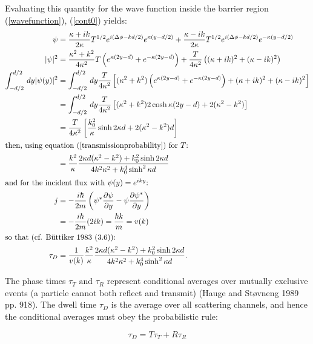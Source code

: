 \documentclass{article}
\begin{document}
\noindent Evaluating this quantity for the wave function inside the barrier region (\ref{wavefunction}), (\ref{cont0}) yields:
\begin{subequations}
\begin{align}
	\psi &= \frac{\kappa +ik}{2\kappa} T^{1/2}e^{i(\Delta\phi-kd/2)}e^{\kappa(y-d/2)} + \frac{\kappa-ik}{2\kappa}T^{1/2}e^{i(\Delta\phi-kd/2)}e^{-\kappa(y-d/2)}\\
	|\psi|^2 &= \frac{\kappa^2+k^2}{4\kappa^2}T\left(e^{\kappa(2y-d)}+e^{-\kappa(2y-d)}\right)+\frac{T}{4\kappa^2}\left((\kappa+ik)^2+(\kappa-ik)^2\right) \\
	\int_{-d/2}^{d/2}\,dy|\psi(y)|^2&=\int_{-d/2}^{d/2}\,dy\frac{T}{4\kappa^2}\left[(\kappa^2+k^2)\left(e^{\kappa(2y-d)}+e^{-\kappa(2y-d)}\right)+(\kappa+ik)^2+(\kappa-ik)^2\right] \\
					&= \int_{-d/2}^{d/2}\,dy\frac{T}{4\kappa^2}\left[(\kappa^2+k^2)2\cosh{\kappa(2y-d)}+2(\kappa^2-k^2)\right] \\
		 &= \frac{T}{4\kappa^2}\left[\frac{k_0^2}{\kappa}\sinh{2\kappa d}+2(\kappa^2-k^2)d\right] \\ \intertext{then, using equation (\ref{transmissionprobability}) for $T$:}
		 &= \frac{k^2}{\kappa}\frac{2\kappa d(\kappa^2-k^2)+k_0^2\sinh{2\kappa d}}{4k^2\kappa^2+k_0^4\sinh^2{\kappa d}}\\ \intertext{and for the incident flux with $\psi(y) = e^{iky}$:
}
j &= -\frac{i\hbar}{2m}\left(\psi^{*}\frac{\partial\psi}{\partial y}-\psi \frac{\partial \psi^{*}}{\partial y}\right) \label{1dflux}\\ 
  &= -\frac{i\hbar}{2m}(2ik) = \frac{\hbar k}{m} = v(k) \\ \intertext{so that (cf. B{\"u}ttiker 1983 (3.6)):}
	\tau_D &= \frac{1}{v(k)}\frac{k^2}{\kappa}\frac{2\kappa d(\kappa^2-k^2)+k_0^2\sinh{2\kappa d}}{4k^2\kappa^2+k_0^4\sinh^2{\kappa d}}.
	\label{dwelltime}
\end{align}
\end{subequations}

\noindent The phase times $\tau_T \text{ and } \tau_R$ represent conditional averages over mutually exclusive events (a particle cannot both reflect and transmit) (Hauge and St{\o}vneng 1989 pp. 918). The dwell time $\tau_D$ is the average over all scattering channels, and hence the conditional averages must obey the probabilistic rule:

\begin{equation}
	\tau_D = T\tau_T+R\tau_R
	\label{dwellcondition}
\end{equation}
\end{document}
